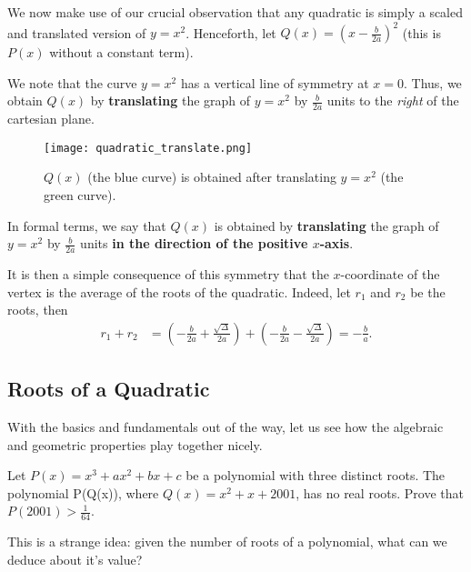 \documentclass[../jarvis.tex]{subfiles}
\begin{document}
We now make use of our crucial observation that any quadratic is simply a scaled and translated version of $y=x^2$. Henceforth, let $Q(x)=\left(x-\frac{b}{2a}\right)^2$ (this is $P(x)$ without a constant term).

We note that the curve $y=x^2$ has a vertical line of symmetry at $x=0$. Thus, we obtain $Q(x)$ by \textbf{translating} the graph of $y=x^2$ by $\frac{b}{2a}$ units to the \textit{right} of the cartesian plane.

\begin{figure}[H]
    \centering
    \texttt{[image: quadratic\_translate.png]}
    \caption{$Q(x)$ (the blue curve) is obtained after translating $y=x^2$ (the green curve).}
\end{figure}

In formal terms, we say that $Q(x)$ is obtained by \textbf{translating} the graph of $y=x^2$ by $\frac{b}{2a}$ units \textbf{in the direction of the positive $x$-axis}. 

It is then a simple consequence of this symmetry that the $x$-coordinate of the vertex is the average of the roots of the quadratic. Indeed, let $r_1$ and $r_2$ be the roots, then
\begin{align*}
    r_1+r_2&=\left(-\frac{b}{2a}+\frac{\sqrt{\Delta}}{2a}\right)+\left(-\frac{b}{2a}-\frac{\sqrt{\Delta}}{2a}\right)=-\frac{b}{a}.
\end{align*}
\subsection{Roots of a Quadratic \ez}
With the basics and fundamentals out of the way, let us see how the algebraic and geometric properties play together nicely.
\begin{example}[2010-2011 Mandelbrot]
    Let $P(x)=x^3+ax^2+bx+c$ be a polynomial with three distinct roots. The polynomial P(Q(x)), where $Q(x)=x^2+x+2001$, has no real roots. Prove that $P(2001)>\frac{1}{64}$.
\end{example}
This is a strange idea: given the number of roots of a polynomial, what can we deduce about it's value?
\end{document}
